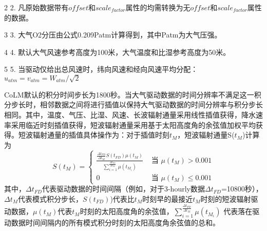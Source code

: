 \begin{landscape}
\begin{Tablenotes}
\item[2] 2. 凡原始数据带有$offset$和$scale_{factor}$属性的均需转换为无$offset$和$scale_{factor}$属性的数据。

\item[3] 3. 大气O2分压由公式0.209Patm计算得到，其中Patm为大气压强。

\item[4] 4. 默认大气风速参考高度为100米，大气温度和比湿参考高度为50米。

\item[5] 5. 当驱动仅给出总风速时，纬向风速和经向风速平均分配：$u_{atm}=v_{atm}=W_{atm}/\sqrt2$

\end{Tablenotes}
\bottomrule
\end{landscape}





CoLM默认的积分时间步长为1800秒。当大气驱动数据的时间分辨率不满足这一积分步长时，相邻数据之间将进行插值以保持大气驱动数据的时间分辨率与积分步长相同。其中，温度、气压、比湿、风速、长波辐射通量采用线性插值获得，降水速率采用临近时刻插值获得，短波辐射通量采用基于太阳高度角的余弦值加权平均获得。短波辐射通量的插值具体操作为：对于插值时刻$t_M$，短波辐射通量S($t_M$)计算为
\begin{equation}\label{t_M}
S\left(t_{M}\right)=\left\{\begin{array}{ll}\frac{\frac{\Delta t_{FD}}{\Delta t_{M}} S\left(t_{F D}\right) \mu\left(t_{M}\right)}{\sum_{i=1}^{\frac{\Delta t_{FD}}{\Delta t_{M}}} \mu\left(t_{M_{i}}\right)} & \text { 当 } \mu\left(t_{M}\right)>0.001 \\ 0 & \text { 当 } \mu\left(t_{M}\right) \leq 0.001\end{array}\right.
\end{equation}
其中，$\Delta t_{FD}$代表驱动数据的时间间隔（例如，对于3-hourly数据$\Delta t_{FD}$=10800秒），$\Delta t_{M}$代表模式积分步长，$S(t_{FD})$)代表比$t_M$时刻早的最接近$t_M$时刻的短波辐射驱动数据，$\mu\left(t_M\right)$代表$t_M$时刻的太阳高度角的余弦值，$
\sum_{i=1}^{\frac{\Delta t_{F D}}{\Delta t_{M}}} \mu\left(t_{M_{i}}\right)$
代表落在驱动数据时间间隔内的所有模式积分时刻的太阳高度角余弦值的总和。

